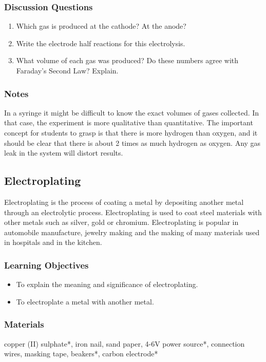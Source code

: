 \subsubsection*{Discussion Questions}
\begin{enumerate}
\item{Which gas is produced at the cathode? At the anode?}
\item{Write the electrode half reactions for this electrolysis.}
\item{What volume of each gas was produced? Do these numbers agree with Faraday's Second Law? Explain.}
\end{enumerate}

\subsubsection*{Notes}
In a syringe it might be difficult to know the exact volumes of gases collected. In that case, the experiment is more qualitative than quantitative. The important concept for students to grasp is that there is more hydrogen than oxygen, and it should be clear that there is about 2 times as much hydrogen as oxygen.
Any gas leak in the system will distort results.

\subsection{Electroplating}

Electroplating is the process of coating a metal by depositing another metal through an electrolytic process. Electroplating is used to coat steel materials with other metals such as silver, gold or chromium. Electroplating is popular in automobile manufacture, jewelry making and the making of many materials used in hospitals and in the kitchen.

\subsubsection*{Learning Objectives}
\begin{itemize}
\item{To explain the meaning and significance of electroplating.}
\item{To electroplate a metal with another metal.}
\end{itemize}

\subsubsection*{Materials}
copper (II) sulphate*, iron nail, sand paper, 4-6V  power source*, connection wires, masking tape, beakers*, carbon electrode*

